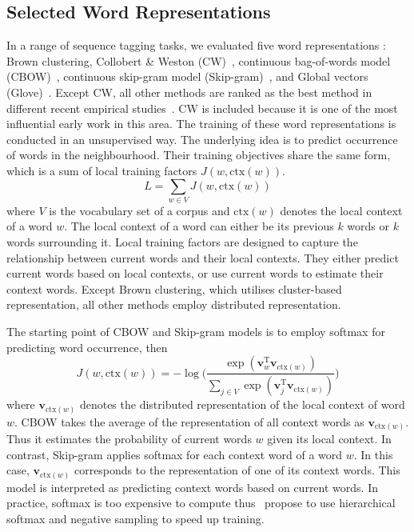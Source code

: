 \subsection{Selected Word Representations}
In a range of sequence tagging tasks, we evaluated five word representations : Brown clustering, Collobert \& Weston (CW)~\cite{collobert2011natural}, continuous bag-of-words model (CBOW)~\cite{Mikolov13}, continuous skip-gram model (Skip-gram)~\cite{Mikolov13NIPS}, and Global vectors (Glove)~\cite{pennington2014glove}. Except CW, all other methods are ranked as the best method in different recent empirical studies~\cite{turian2010word,pennington2014glove}. CW is included because it is one of the most influential early work in this area. The training of these word representations is conducted in an unsupervised way. The underlying idea is to predict occurrence of words in the neighbourhood. Their training objectives share the same form, which is a sum of local training factors $J(w, \text{ctx}(w))$. 
\begin{displaymath}
L = \sum_{w \in V} J(w, \text{ctx}(w))
\end{displaymath}
where $V$ is the vocabulary set of a corpus and $\text{ctx}(w)$ denotes the local context of a word $w$. The local context of a word can either be its previous $k$ words or $k$ words surrounding it. Local training factors are designed to capture the relationship between current words and their local contexts. They either predict current words based on local contexts, or use current words to estimate their context words. Except Brown clustering, which utilises cluster-based representation, all other methods employ distributed representation.

The starting point of CBOW and Skip-gram models is to employ softmax for predicting word occurrence, then
\begin{displaymath}
J(w, \text{ctx}(w)) = - \log \big ( \frac{\exp(\mathbf{v}_w^{\text{T}} \mathbf{v}_{\text{ctx}(w)})}{ \sum_{j \in V} \exp(\mathbf{v}_j^{\text{T}} \mathbf{v}_{\text{ctx}(w)})} \big )
\end{displaymath}
where $\mathbf{v}_{\text{ctx}(w)}$ denotes the distributed representation of the local context of word $w$. CBOW takes the average of the representation of all context words as $\mathbf{v}_{\text{ctx}(w)}$. Thus it estimates the probability of current words $w$ given its local context. In contrast, Skip-gram applies softmax for each context word of a word $w$. In this case, $\mathbf{v}_{\text{ctx}(w)}$ corresponds to the representation of one of its context words. This model is interpreted as predicting context words based on current words. In practice, softmax is too expensive to compute thus~ propose to use hierarchical softmax and negative sampling to speed up training.


